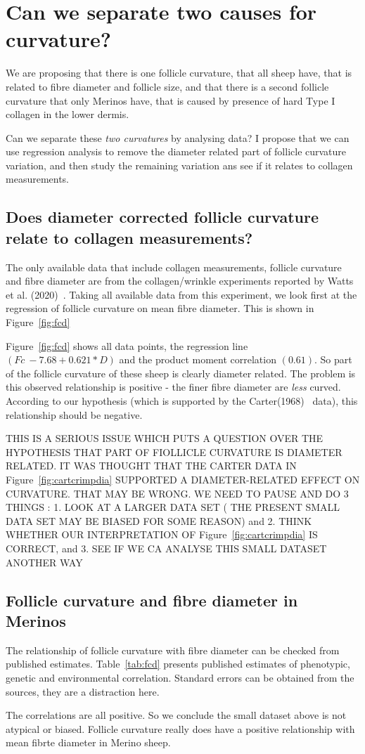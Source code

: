 \documentclass{article}
\begin{document}
\section{Can we separate two causes for curvature?}
We are proposing that there is one follicle curvature, that all sheep have, that is related to fibre diameter and follicle size, and that there is a second follicle curvature that only Merinos have, that is caused by  presence of hard Type I collagen in the lower dermis.

Can we separate these {\em two curvatures} by analysing data?  I propose that we can use regression analysis to remove the diameter related part of follicle curvature variation, and then study the remaining variation ans see if it relates to collagen measurements.

\subsection{ Does diameter corrected follicle curvature relate to collagen measurements?}
The only available data that include collagen measurements, follicle curvature and fibre diameter are  from the collagen/wrinkle experiments reported by Watts et al. (2020)~\cite{watts-2020}. Taking all available data from this experiment, we look first at the regression of follicle curvature on mean fibre diameter. This is shown in Figure~\ref{fig:fcd}

Figure~\ref{fig:fcd} shows all data points, the regression line $(Fc ~  -7.68   + 0.621 * D)$ and the product moment correlation $(0.61)$. So part of the follicle curvature of these sheep is clearly diameter related.  The problem is this observed relationship is positive - the finer fibre diameter are {\em less} curved. According to our hypothesis (which is supported by the Carter(1968)~\cite{carter-1968} data), this relationship should be negative. 

THIS IS A SERIOUS ISSUE WHICH PUTS A QUESTION OVER THE HYPOTHESIS THAT PART OF FIOLLICLE CURVATURE IS DIAMETER RELATED. IT WAS THOUGHT THAT THE CARTER DATA IN Figure~\ref{fig:cartcrimpdia} SUPPORTED A DIAMETER-RELATED EFFECT ON CURVATURE. THAT MAY BE WRONG. WE NEED TO PAUSE AND DO 3 THINGS : 1. LOOK AT A LARGER DATA SET ( THE PRESENT SMALL DATA SET MAY BE BIASED FOR SOME REASON) and 2. THINK WHETHER OUR INTERPRETATION OF  Figure~\ref{fig:cartcrimpdia} IS CORRECT, and 3. SEE IF WE CA ANALYSE THIS SMALL DATASET ANOTHER WAY


\subsection{Follicle curvature and fibre diameter in Merinos}
\label{sec:pubcor}
The relationship of follicle curvature with fibre diameter can be checked from published estimates. Table~\ref{tab:fcd} presents published estimates of phenotypic, genetic and environmental correlation. Standard errors can be obtained from the sources, they are a distraction here.

The correlations are all positive. So we conclude the small dataset above is not atypical or biased. Follicle curvature really does have a positive relationship with mean fibrte diameter in Merino sheep.
\end{document}
